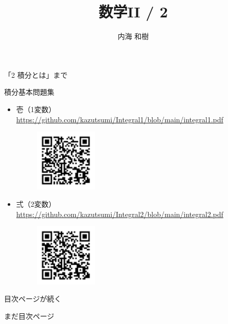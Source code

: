 \documentclass[10pt, uplatex, dvipdfmx]{jsarticle}
\title{\Huge 数学II / 2}
\author{\Large 内海 和樹}
\theoremstyle{definition}
\numberwithin{equation}{section}
\begin{document}
\maketitle

\begin{center}
  「2 積分とは」まで
\end{center}

\vspace{5zh}
\begin{center}
  {\LARGE 積分基本問題集}

  \begin{itemize}
    \setlength{\itemsep}{2zh}
    
  \item 壱（1変数） \url{https://github.com/kazutsumi/Integral1/blob/main/integral1.pdf}
    \begin{figure}[h]
      \centering
      \includegraphics[width=3cm]{./pictures/QR/1.png}
    \end{figure}
    
  \item 弍（2変数） \url{https://github.com/kazutsumi/Integral2/blob/main/integral2.pdf}
    \begin{figure}[h]
      \centering
      \includegraphics[width=3cm]{./pictures/QR/2.png}
    \end{figure}
  \end{itemize}
\end{center}


\thispagestyle{empty}

\clearpage

\tableofcontents

\newpage

目次ページが続く

\newpage

まだ目次ページ

\newpage
\end{document}
